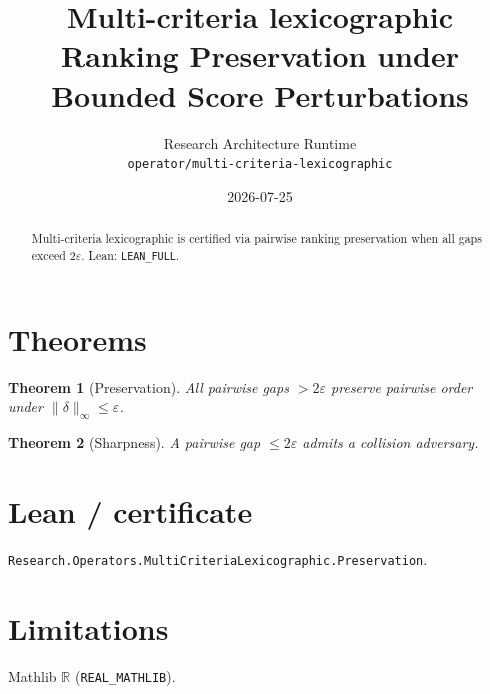 \documentclass[11pt]{article}
\title{Multi-criteria lexicographic Ranking Preservation under Bounded Score Perturbations}
\author{Research Architecture Runtime \\ \texttt{operator/multi-criteria-lexicographic}}
\date{2026-07-25}
\newtheorem{theorem}{Theorem}
\begin{document}
\maketitle
\begin{abstract}
Multi-criteria lexicographic is certified via pairwise ranking preservation when all gaps exceed $2\varepsilon$. Lean: \texttt{LEAN\_FULL}.
\end{abstract}
\section{Theorems}
\begin{theorem}[Preservation]
All pairwise gaps $>2\varepsilon$ preserve pairwise order under $\|\delta\|_\infty\le\varepsilon$.
\end{theorem}
\begin{theorem}[Sharpness]
A pairwise gap $\le 2\varepsilon$ admits a collision adversary.
\end{theorem}
\section{Lean / certificate}
\texttt{Research.Operators.MultiCriteriaLexicographic.Preservation}.
\section{Limitations}
Mathlib $\mathbb{R}$ (\texttt{REAL\_MATHLIB}).
\end{document}
